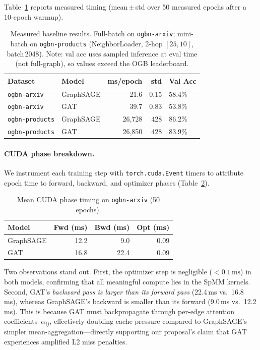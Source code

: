 \documentclass[sigconf,review]{acmart}
\begin{document}
Table~\ref{tab:baseline} reports measured timing (mean\,$\pm$\,std over 50
measured epochs after a 10-epoch warmup).

\begin{table}[h]
\centering
\caption{Measured baseline results. Full-batch on \texttt{ogbn-arxiv};
mini-batch on \texttt{ogbn-products} (NeighborLoader, 2-hop $[25,10]$,
batch\,2048). Note: val acc uses sampled inference at eval time
(not full-graph), so values exceed the OGB leaderboard.}
\label{tab:baseline}
\begin{tabular}{llrrl}
\toprule
\textbf{Dataset} & \textbf{Model} & \textbf{ms/epoch} & \textbf{std} & \textbf{Val Acc} \\
\midrule
\texttt{ogbn-arxiv}    & GraphSAGE & 21.6     & 0.15 & 58.4\% \\
\texttt{ogbn-arxiv}    & GAT       & 39.7     & 0.83 & 53.8\% \\
\texttt{ogbn-products} & GraphSAGE & 26{,}728 & 428  & 86.2\% \\
\texttt{ogbn-products} & GAT       & 26{,}850 & 428  & 83.9\% \\
\bottomrule
\end{tabular}
\end{table}

\paragraph{CUDA phase breakdown.}
We instrument each training step with \texttt{torch.cuda.Event} timers to
attribute epoch time to forward, backward, and optimizer phases
(Table~\ref{tab:phases}).

\begin{table}[h]
\centering
\caption{Mean CUDA phase timing on \texttt{ogbn-arxiv} (50 epochs).}
\label{tab:phases}
\begin{tabular}{lrrr}
\toprule
\textbf{Model} & \textbf{Fwd (ms)} & \textbf{Bwd (ms)} & \textbf{Opt (ms)} \\
\midrule
GraphSAGE & 12.2 & \phantom{0}9.0 & 0.09 \\
GAT       & 16.8 & 22.4 & 0.09 \\
\bottomrule
\end{tabular}
\end{table}

Two observations stand out.
First, the optimizer step is negligible ($<\!0.1\,\text{ms}$) in both
models, confirming that all meaningful compute lies in the SpMM kernels.
Second, GAT's \emph{backward pass is larger than its forward pass}
(22.4\,ms vs.\ 16.8\,ms), whereas GraphSAGE's backward is smaller than
its forward (9.0\,ms vs.\ 12.2\,ms).
This is because GAT must backpropagate through per-edge attention
coefficients~$\alpha_{ij}$, effectively doubling cache pressure
compared to GraphSAGE's simpler mean-aggregation---directly supporting our
proposal's claim that GAT experiences amplified L2 miss penalties.
\end{document}
